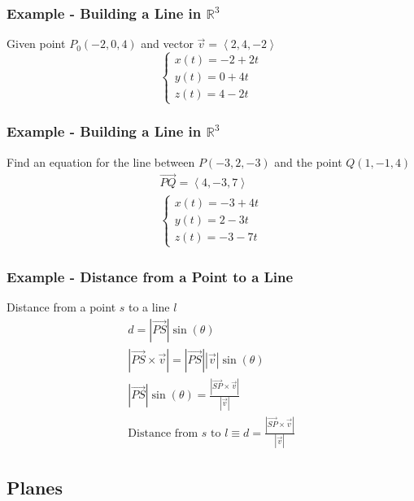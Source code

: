 \documentclass{article}
\newcommand{\nvec}[1]{\left\langle #1 \right\rangle}
\begin{document}
        \subsubsection{Example - Building a Line in $\mathbb{R}^3$}
        Given point $P_0(-2,0,4)$ and vector $\vec{v}=\nvec{2,4,-2}$\\
        \[
            \begin{cases}
                x(t)=-2+2t\\
                y(t)=0+4t\\
                z(t)=4-2t
            \end{cases}
        \]

        \subsubsection{Example - Building a Line in $\mathbb{R}^3$}
        Find an equation for the line between $P(-3,2,-3)$ and the point $Q(1,-1,4)$\\
        \[
        \begin{aligned}
            \vec{PQ}=\nvec{4,-3,7}\\
            \begin{cases}
                x(t)=-3+4t\\
                y(t)=2-3t\\
                z(t)=-3-7t
            \end{cases}
        \end{aligned}
        \]

        \subsubsection{Example - Distance from a Point to a Line}
        Distance from a point $s$ to a line $l$
        \[
        \begin{aligned}
        d=|\vec{PS}|\sin(\theta)\\
        |\vec{PS}\times\vec{v}|=|\vec{PS}||\vec{v}|\sin(\theta)\\
        |\vec{PS}|\sin(\theta)=\frac{|\vec{SP}\times\vec{v}|}{|\vec{v}|}\\
        \text{Distance from }s\text{ to }l\equiv d=\frac{|\vec{SP}\times\vec{v}|}{|\vec{v}|}
        \end{aligned}
        \]

    \subsection{Planes}
\end{document}
